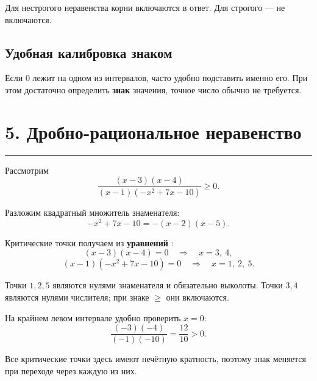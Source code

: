\documentclass[a4paper,12pt]{article}
\newcommand{\topicsection}[1]{%
    \section*{\textcolor{darkaccent}{#1}}%
    \vspace{-0.4em}%
    \textcolor{accent}{\rule{\linewidth}{0.7pt}}%
    \vspace{0.4em}%
}
\newcommand{\key}[1]{%
    \textcolor{darkaccent}{\textbf{#1}}%
}
\begin{document}
Для нестрогого неравенства корни включаются в ответ. Для строгого --- не включаются.

\subsection*{Удобная калибровка знаком}

Если \(0\) лежит на одном из интервалов, часто удобно подставить именно его. При этом достаточно определить \key{знак} значения, точное число обычно не требуется.

\topicsection{5. Дробно-рациональное неравенство}

Рассмотрим
\[
\frac{(x-3)(x-4)}
     {(x-1)(-x^2+7x-10)}
\ge 0.
\]

Разложим квадратный множитель знаменателя:
\[
-x^2+7x-10
=
-(x-2)(x-5).
\]

Критические точки получаем из \key{уравнений}:
\[
(x-3)(x-4)=0
\quad\Longrightarrow\quad
x=3,\ 4,
\]
\[
(x-1)(-x^2+7x-10)=0
\quad\Longrightarrow\quad
x=1,\ 2,\ 5.
\]

Точки \(1,2,5\) являются нулями знаменателя и обязательно выколоты. Точки \(3,4\) являются нулями числителя; при знаке \(\ge\) они включаются.

На крайнем левом интервале удобно проверить \(x=0\):
\[
\frac{(-3)(-4)}
     {(-1)(-10)}
=
\frac{12}{10}
>
0.
\]

Все критические точки здесь имеют нечётную кратность, поэтому знак меняется при переходе через каждую из них.

\begin{center}
\end{center}
\end{document}
